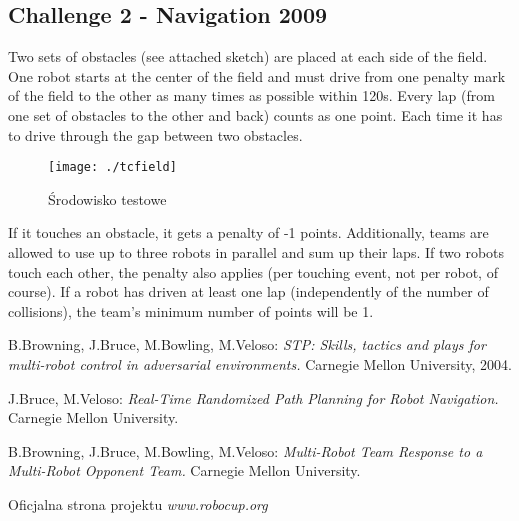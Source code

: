 \documentclass[11pt,onecolumn,a4paper,final]{article}
\begin{document}
\subsection*{Challenge 2 - Navigation 2009}
Two sets of obstacles (see attached sketch) are placed at each side of the field. One robot starts at
the center of the field and must drive from one penalty mark of the field to the other as many times as possible within 120s.
Every lap (from one set of obstacles to the other and back) counts as one point.
Each time it has to drive through the gap between two obstacles.
\begin{figure}[!h]
\centering
\texttt{[image: ./tcfield]}
\caption{Środowisko testowe} \label{fig:arch}
\end{figure}
If it touches an obstacle, it gets a penalty of -1 points.
Additionally, teams are allowed to use up to three robots in parallel and sum up their laps.
If two robots touch each other, the penalty also applies (per touching event, not per robot, of course).
If a robot has driven at least one lap (independently of the number of collisions), the team's minimum number of points will be 1. 

\begin{thebibliography}{9}
	B.Browning, J.Bruce, M.Bowling, M.Veloso:
	\emph{STP: Skills, tactics and plays for multi-robot control
             in adversarial environments.}
	  Carnegie Mellon University, 2004.

	J.Bruce, M.Veloso: 
	\emph{Real-Time Randomized Path Planning for Robot Navigation.}
	  Carnegie Mellon University.

	B.Browning, J.Bruce, M.Bowling, M.Veloso:
	\emph{Multi-Robot Team Response to a Multi-Robot
             Opponent Team.}
	  Carnegie Mellon University.
	  
	Oficjalna strona projektu
	\emph{www.robocup.org}

\end{thebibliography}
\end{document}
